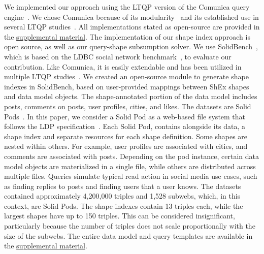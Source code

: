 We implemented our approach using the LTQP version of the Comunica query engine~\cite{taelman_iswc_resources_comunica_2018}.
We chose Comunica because of its modularity~\cite{taelman_swj_componentsjs_2022} and its established use in several LTQP studies~\cite{Bogaerts2021LinkTW, Taelman2023, eschauzier_quweda_linkqueue_2023, Hanski2024, eschauzier_amw_rcubemetric_2024, tam2024opportunitiesshapebasedoptimizationlink}.
All implementations stated as open-source are provided in the \hyperref[sec:supplementalMaterial]{supplemental material}.
The implementation of our shape index approach is open source, as well as our query-shape subsumption solver.
We use SolidBench~\cite{Taelman2023}, which is based on the LDBC social network benchmark~\cite{Angles2020}, to evaluate our contribution.
Like Comunica, it is easily extendable and has been utilized in multiple LTQP studies~\cite{Bogaerts2021LinkTW, Taelman2023, eschauzier_quweda_linkqueue_2023, Hanski2024, eschauzier_amw_rcubemetric_2024, tam2024opportunitiesshapebasedoptimizationlink}.
We created an open-source module to generate shape indexes in SolidBench, based on user-provided mappings between ShEx shapes and data model objects.
The shape-annotated portion of the data model includes posts, comments on posts, user profiles, cities, and likes.
The datasets are Solid Pods~\cite{sambra_solid_2016, dedecker2022s}.
In this paper, we consider a Solid Pod as a web-based file system that follows the LDP specification~\cite{w3LinkedData}.
Each Solid Pod, contains alongside its data, a shape index and separate resources for each shape definition.
Some shapes are nested within others. 
For example, user profiles are associated with cities, and comments are associated with posts.
Depending on the pod instance, certain data model objects are materialized in a single file, while others are distributed across multiple files.
Queries simulate typical read action in social media use cases, such as finding replies to posts and finding users that a user knows.
The datasets contained approximately 4,200,000 triples and 1,528 subwebs, which, in this context, are Solid Pods.
The shape indexes contain 13 triples each, while the largest shapes have up to 150 triples. 
This can be considered insignificant, particularly because the number of triples does not scale proportionally with the size of the subwebs.
The entire data model and query templates are available in the  \hyperref[sec:supplementalMaterial]{supplemental material}.

